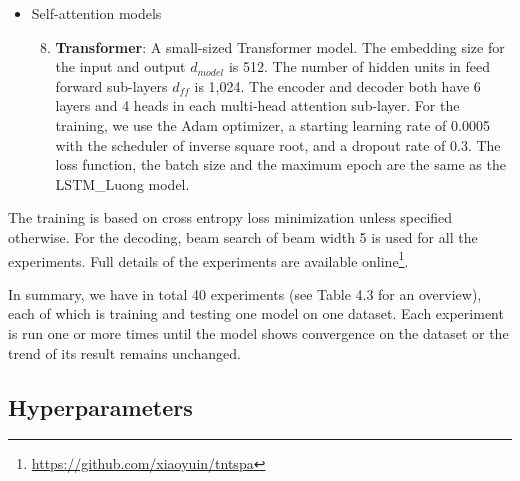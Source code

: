 \begin{itemize}
\begin{enumerate}
\setcounter{enumi}{6}
\item \textbf{ConvS2S}: a Convolutional Sequence-to-Sequence model. Both the encoder and decoder consist of 15 layers of convolutional block, where the first 9 layers have 512 units and convolutional kernel width of 3, next 4 layers have 1,024 units and kernel width of 3, and final 2 layers have 2,048 units and kernel width of 1. The embedding size is 768 for the encoder and the input of the decoder and 512 for the output of the decoder. In terms of the training, we use a fixed learning rate of 0.5 and a dropout rate of 0.2. The loss function, the batch size and the maximum epoch are the same as the LSTM\_Luong model.
\end{enumerate}
\item Self-attention models
\begin{enumerate}
\setcounter{enumi}{7}
\item \textbf{Transformer}: A small-sized Transformer model. The embedding size for the input and output $ d_{model} $ is 512. The number of hidden units in feed forward sub-layers $ d_{ff} $ is 1,024. The encoder and decoder both have 6 layers and 4 heads in each multi-head attention sub-layer. For the training, we use the Adam optimizer, a starting learning rate of 0.0005 with the scheduler of inverse square root, and a dropout rate of 0.3. The loss function, the batch size and the maximum epoch are the same as the LSTM\_Luong model.
\end{enumerate}
\end{itemize}

The training is based on cross entropy loss minimization unless specified otherwise. For the decoding, beam search of beam width 5 is used for all the experiments. Full details of the experiments are available online\footnote{\url{https://github.com/xiaoyuin/tntspa}}.

In summary, we have in total 40 experiments (see Table 4.3 for an overview), each of which is training and testing one model on one dataset. Each experiment is run one or more times until the model shows convergence on the dataset or the trend of its result remains unchanged.

\subsection{Hyperparameters} \label{subsection:hyperparams}

